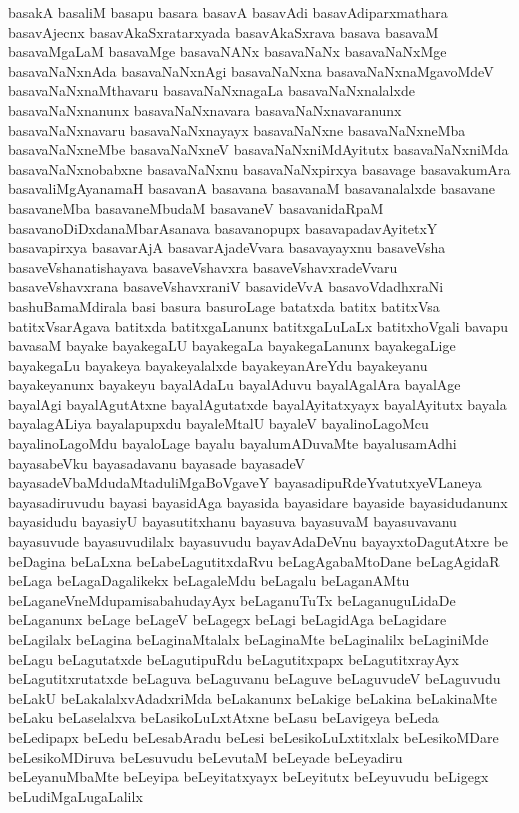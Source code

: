 {basakA
basaliM
basapu
basara
basavA
basavAdi
basavAdiparxmathara
basavAjecnx
basavAkaSxratarxyada
basavAkaSxrava
basava
basavaM
basavaMgaLaM
basavaMge
basavaNANx
basavaNaNx
basavaNaNxMge
basavaNaNxnAda
basavaNaNxnAgi
basavaNaNxna
basavaNaNxnaMgavoMdeV
basavaNaNxnaMthavaru
basavaNaNxnagaLa
basavaNaNxnalalxde
basavaNaNxnanunx
basavaNaNxnavara
basavaNaNxnavaranunx
basavaNaNxnavaru
basavaNaNxnayayx
basavaNaNxne
basavaNaNxneMba
basavaNaNxneMbe
basavaNaNxneV
basavaNaNxniMdAyitutx
basavaNaNxniMda
basavaNaNxnobabxne
basavaNaNxnu
basavaNaNxpirxya
basavage
basavakumAra
basavaliMgAyanamaH
basavanA
basavana
basavanaM
basavanalalxde
basavane
basavaneMba
basavaneMbudaM
basavaneV
basavanidaRpaM
basavanoDiDxdanaMbarAsanava
basavanopupx
basavapadavAyitetxY
basavapirxya
basavarAjA
basavarAjadeVvara
basavayayxnu
basaveVsha
basaveVshanatishayava
basaveVshavxra
basaveVshavxradeVvaru
basaveVshavxrana
basaveVshavxraniV
basavideVvA
basavoVdadhxraNi
bashuBamaMdirala
basi
basura
basuroLage
batatxda
batitx
batitxVsa
batitxVsarAgava
batitxda
batitxgaLanunx
batitxgaLuLaLx
batitxhoVgali
bavapu
bavasaM
bayake
bayakegaLU
bayakegaLa
bayakegaLanunx
bayakegaLige
bayakegaLu
bayakeya
bayakeyalalxde
bayakeyanAreYdu
bayakeyanu
bayakeyanunx
bayakeyu
bayalAdaLu
bayalAduvu
bayalAgalAra
bayalAge
bayalAgi
bayalAgutAtxne
bayalAgutatxde
bayalAyitatxyayx
bayalAyitutx
bayala
bayalagALiya
bayalapupxdu
bayaleMtalU
bayaleV
bayalinoLagoMcu
bayalinoLagoMdu
bayaloLage
bayalu
bayalumADuvaMte
bayalusamAdhi
bayasabeVku
bayasadavanu
bayasade
bayasadeV
bayasadeVbaMdudaMtaduliMgaBoVgaveY
bayasadipuRdeYvatutxyeVLaneya
bayasadiruvudu
bayasi
bayasidAga
bayasida
bayasidare
bayaside
bayasidudanunx
bayasidudu
bayasiyU
bayasutitxhanu
bayasuva
bayasuvaM
bayasuvavanu
bayasuvude
bayasuvudilalx
bayasuvudu
bayavAdaDeVnu
bayayxtoDagutAtxre
be
beDagina
beLaLxna
beLabeLagutitxdaRvu
beLagAgabaMtoDane
beLagAgidaR
beLaga
beLagaDagalikekx
beLagaleMdu
beLagalu
beLaganAMtu
beLaganeVneMdupamisabahudayAyx
beLaganuTuTx
beLaganuguLidaDe
beLaganunx
beLage
beLageV
beLagegx
beLagi
beLagidAga
beLagidare
beLagilalx
beLagina
beLaginaMtalalx
beLaginaMte
beLaginalilx
beLaginiMde
beLagu
beLagutatxde
beLagutipuRdu
beLagutitxpapx
beLagutitxrayAyx
beLagutitxrutatxde
beLaguva
beLaguvanu
beLaguve
beLaguvudeV
beLaguvudu
beLakU
beLakalalxvAdadxriMda
beLakanunx
beLakige
beLakina
beLakinaMte
beLaku
beLaselalxva
beLasikoLuLxtAtxne
beLasu
beLavigeya
beLeda
beLedipapx
beLedu
beLesabAradu
beLesi
beLesikoLuLxtitxlalx
beLesikoMDare
beLesikoMDiruva
beLesuvudu
beLevutaM
beLeyade
beLeyadiru
beLeyanuMbaMte
beLeyipa
beLeyitatxyayx
beLeyitutx
beLeyuvudu
beLigegx
beLudiMgaLugaLalilx
}
